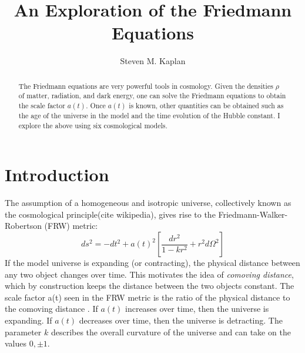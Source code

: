 \documentclass[aps,reprint,prl]{revtex4-1}
\begin{document}
\title{An Exploration of the Friedmann Equations}
\author{Steven M. Kaplan}

\begin{abstract}
The Friedmann equations are very powerful tools in cosmology.  Given the densities $\rho$ of matter, radiation, and dark energy, one can solve the Friedmann equations to obtain the scale factor $a(t)$.  Once $a(t)$ is known, other quantities can be obtained such as the age of the universe in the model and the time evolution of the Hubble constant.  I explore the above using six cosmological models.
\end{abstract}

\maketitle

\section*{Introduction}
The assumption of a homogeneous and isotropic universe, collectively known as the cosmological principle(cite wikipedia), gives rise to the Friedmann-Walker-Robertson (FRW) metric:
$$ds^2=-dt^2 + a(t)^2\left[ \frac{dr^2}{1-kr^2} + r^2d\Omega^2 \right]$$
If the model universe is expanding (or contracting), the physical distance between any two object changes over time.  This motivates the idea of \emph{comoving distance}, which by construction keeps the distance between the two objects constant.  The scale factor a(t) seen in the FRW metric is the ratio of the physical distance to the comoving distance \cite{wiki_scalefactor}.  If $a(t)$ increases over time, then the universe is expanding.  If $a(t)$ decreases over time, then the universe is detracting.  The parameter $k$ describes the overall curvature of the universe and can take on the values $0,\pm1$.
\end{document}

